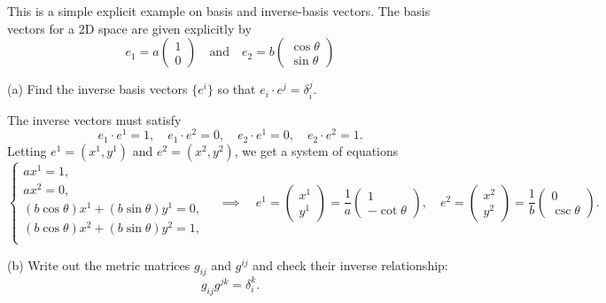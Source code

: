 \documentclass{../../templates/lkx_pset}
\begin{document}
\begin{problem}{2}
This is a simple explicit example on basis and inverse-basis vectors. The basis vectors for a 2D space are given explicitly by
\[
	e_1 = a\begin{pmatrix}1\\0\end{pmatrix}
	\quad\textrm{and}\quad
	e_2 = b\begin{pmatrix}\cos\theta\\\sin\theta\end{pmatrix}
\]
\end{problem}

\begin{parts}
	\begin{part}{(a)}
		Find the inverse basis vectors $\{e^i\}$ so that $e_i \cdot e^j = \delta^j_i$.
	\end{part}

	The inverse vectors must satisfy
	\[
		e_1\cdot e^1 = 1, \quad e_1\cdot e^2 = 0, \quad e_2\cdot e^1 = 0,\quad e_2\cdot e^2 = 1.
	\]
	Letting $e^1=(x^1, y^1)$ and $e^2 = (x^2,y^2)$, we get a system of equations
	\[
		\begin{cases}
			a x^1 = 1,                               \\
			a x^2 = 0,                               \\
			(b\cos\theta)x^1 + (b\sin\theta)y^1 = 0, \\
			(b\cos\theta)x^2 + (b\sin\theta)y^2 = 1, \\
		\end{cases}
		\quad\implies\quad
		e^1 = \begin{pmatrix}x^1\\ y^1\end{pmatrix} = \frac{1}{a}\begin{pmatrix} 1\\ -\cot\theta\end{pmatrix},
		\quad
		e^2 = \begin{pmatrix}x^2\\ y^2\end{pmatrix} = \frac{1}{b}\begin{pmatrix} 0\\ \csc\theta\end{pmatrix}.
	\]

	\begin{part}{(b)}
		Write out the metric matrices $g_{ij}$ and $g^{ij}$ and check their inverse relationship:
		\[
			g_{ij}g^{j k} = \delta^k_i.
		\]
	\end{part}


\end{parts}
\end{document}
